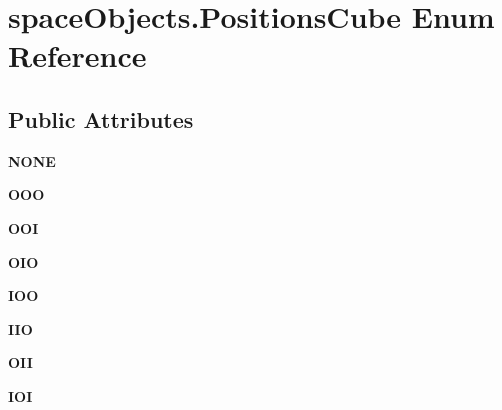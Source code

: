 \hypertarget{enumspace_objects_1_1_positions_cube}{}\section{space\+Objects.\+Positions\+Cube Enum Reference}
\label{enumspace_objects_1_1_positions_cube}
\subsection*{Public Attributes}
\begin{DoxyCompactItemize}
\item 
{\bfseries N\+O\+NE}\hypertarget{enumspace_objects_1_1_positions_cube_ab013d81882824cd3f115a81d819ba99c}{}\label{enumspace_objects_1_1_positions_cube_ab013d81882824cd3f115a81d819ba99c}

\item 
{\bfseries O\+OO}\hypertarget{enumspace_objects_1_1_positions_cube_a03592a9617bca457eff42cc17169dcbe}{}\label{enumspace_objects_1_1_positions_cube_a03592a9617bca457eff42cc17169dcbe}

\item 
{\bfseries O\+OI}\hypertarget{enumspace_objects_1_1_positions_cube_ad06ca8feea253931b442c2c966136779}{}\label{enumspace_objects_1_1_positions_cube_ad06ca8feea253931b442c2c966136779}

\item 
{\bfseries O\+IO}\hypertarget{enumspace_objects_1_1_positions_cube_a855b12a06f899185a9dc815bd06ebd56}{}\label{enumspace_objects_1_1_positions_cube_a855b12a06f899185a9dc815bd06ebd56}

\item 
{\bfseries I\+OO}\hypertarget{enumspace_objects_1_1_positions_cube_a110cf046b9a973af4750627f41196169}{}\label{enumspace_objects_1_1_positions_cube_a110cf046b9a973af4750627f41196169}

\item 
{\bfseries I\+IO}\hypertarget{enumspace_objects_1_1_positions_cube_a2abbffc5a806aa1c48e780fb662a90aa}{}\label{enumspace_objects_1_1_positions_cube_a2abbffc5a806aa1c48e780fb662a90aa}

\item 
{\bfseries O\+II}\hypertarget{enumspace_objects_1_1_positions_cube_ad8ccd76124d548ac40fa7c28b276dae9}{}\label{enumspace_objects_1_1_positions_cube_ad8ccd76124d548ac40fa7c28b276dae9}

\item 
{\bfseries I\+OI}\hypertarget{enumspace_objects_1_1_positions_cube_aeacc958ccb6bcac73e8ab9455873fb79}{}\label{enumspace_objects_1_1_positions_cube_aeacc958ccb6bcac73e8ab9455873fb79}

\end{DoxyCompactItemize}


